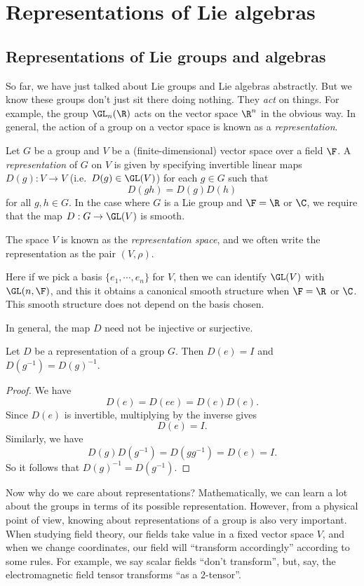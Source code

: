 \documentclass[a4paper]{article}
\begin{document}
\section{Representations of Lie algebras}
\subsection{Representations of Lie groups and algebras}
So far, we have just talked about Lie groups and Lie algebras abstractly. But we know these groups don't just sit there doing nothing. They \emph{act} on things. For example, the group $\GL_n(\R)$ acts on the vector space $\R^n$ in the obvious way. In general, the action of a group on a vector space is known as a \emph{representation}.

\begin{defi}
  Let $G$ be a group and $V$ be a (finite-dimensional) vector space over a field $\F$. A \emph{representation} of $G$ on $V$ is given by specifying invertible linear maps $D(g): V \to V$ (i.e.\ $D(g) \in \GL(V)$) for each $g \in G$ such that
  \[
    D(gh) = D(g)D(h)
  \]
  for all $g, h \in G$. In the case where $G$ is a Lie group and $\F = \R$ or $\C$, we require that the map $D: G \to \GL(V)$ is smooth.

  The space $V$ is known as the \emph{representation space}, and we often write the representation as the pair $(V, \rho)$.
\end{defi}
Here if we pick a basis $\{e_1, \cdots, e_n\}$ for $V$, then we can identify $\GL(V)$ with $\GL(n, \F)$, and this it obtains a canonical smooth structure when $\F = \R$ or $\C$. This smooth structure does not depend on the basis chosen.

In general, the map $D$ need not be injective or surjective.

\begin{prop}
  Let $D$ be a representation of a group $G$. Then $D(e) = I$ and $D(g^{-1}) = D(g)^{-1}$.
\end{prop}

\begin{proof}
  We have
  \[
    D(e) = D(ee) = D(e) D(e).
  \]
  Since $D(e)$ is invertible, multiplying by the inverse gives
  \[
    D(e) = I.
  \]
  Similarly, we have
  \[
    D(g) D(g^{-1}) = D(gg^{-1})= D(e) = I.
  \]
  So it follows that $D(g)^{-1} = D(g^{-1})$.
\end{proof}

Now why do we care about representations? Mathematically, we can learn a lot about the groups in terms of its possible representation. However, from a physical point of view, knowing about representations of a group is also very important. When studying field theory, our fields take value in a fixed vector space $V$, and when we change coordinates, our field will ``transform accordingly'' according to some rules. For example, we say scalar fields ``don't transform'', but, say, the electromagnetic field tensor transforms ``as a $2$-tensor''.
\end{document}
